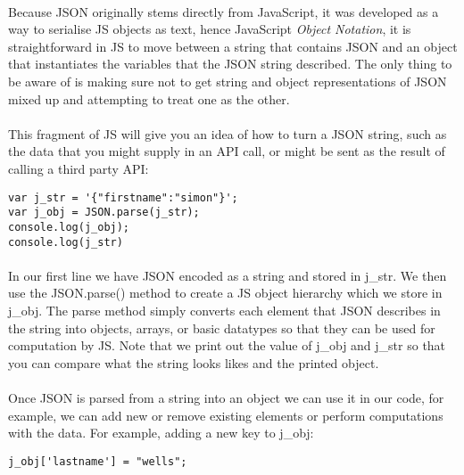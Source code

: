 \documentclass[10pt, a4paper]{article}
\begin{document}
\paragraph{} Because JSON originally stems directly from JavaScript, it was developed as a way to serialise JS objects as text, hence JavaScript \emph{Object Notation}, it is straightforward in JS to move between a string that contains JSON and an object that instantiates the variables that the JSON string described. The only thing to be aware of is making sure not to get string and object representations of JSON mixed up and attempting to treat one as the other.

\paragraph{} This fragment of JS will give you an idea of how to turn a JSON string, such as the data that you might supply in an API call, or might be sent as the result of calling a third party API:

\begin{lstlisting}
var j_str = '{"firstname":"simon"}';
var j_obj = JSON.parse(j_str);
console.log(j_obj);
console.log(j_str)
\end{lstlisting}

\paragraph{} In our first line we have JSON encoded as a string and stored in j\_str. We then use the JSON.parse() method to create a JS object hierarchy which we store in j\_obj. The parse method simply converts each element that JSON describes in the string into objects, arrays, or basic datatypes so that they can be used for computation by JS. Note that we print out the value of j\_obj and j\_str so that you can compare what the string looks likes and the printed object.

\paragraph{} Once JSON is parsed from a string into an object we can use it in our code, for example, we can add new or remove existing elements or perform computations with the data. For example, adding a new key to j\_obj:

\begin{lstlisting}
j_obj['lastname'] = "wells";
\end{lstlisting}
\end{document}
